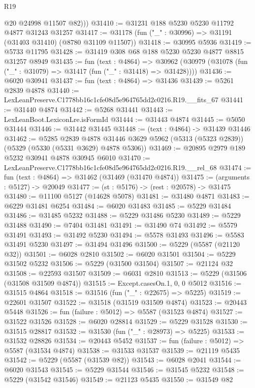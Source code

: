 \begin{lexlean}{R19}
\begin{coremodule}
          @20
          @24998
          @11507
          @82)))
@31410 := @31231 @188 @5230 @5230 @11792 @4877 @31243 @31257
@31417 := @31178 (fun ("_" : @30996) => @31191 (@31403 @31410) (@8780 @31109 @11507))
@31418 := @30995 @5936
@31419 := @5733 @11795
@31428 := @31419 @308 @68 @188 @5230 @5230 @4877 @8815 @31257 @8949
@31435 := fun (text : @4864) =>
  @30962 (@30979 (@31078 (fun ("_" : @31079) => @31417 (fun ("_" : @31418) => @31428))))
@31436 := @6020 @30941
@31437 := fun (text : @4864) => @31436
@31439 := @5261 @2839 @4878
@31440 := LexLeanPreserve.C1778bb16c1cfe08d5e964765dd2c0216.R19.__fits_67
@31441 := @31440 @4874
@31442 := @5268 @31441
@31443 := LexLeanBoot.LexiconLre.isFormId
@31444 := @31443 @4874
@31445 := @5050 @31444
@31446 := @31442 @31445
@31448 := (text : @4864) -> @31439 @31446
@31462 := @5285
    @2839
    @4878
    @31446
    @3629
    @5962
    (@5313 (@5323 @2839))
    (@5329 (@5330 (@5331 @3629) @4878 @5306))
@31469 := @20895 @2979 @189 @5232 @30941 @4878 @30945 @6010
@31470 := LexLeanPreserve.C1778bb16c1cfe08d5e964765dd2c0216.R19.__rel_68
@31474 := fun (text : @4864) => @31462 (@31469 (@31470 @4874))
@31475 := (arguments : @5127) -> @20049
@31477 := (st : @5176) -> (rest : @20578) -> @31475
@31480 := @11100 @5127 (@14628 @5078)
@31481 := @31480 @4871
@31483 := @6229 @31481 @6254
@31484 := @6020 @31483
@31485 := @5229 @31484
@31486 := @31485 @5232
@31488 := @5229 @31486 @5230
@31489 := @5229 @31488
@31490 := @7404 @31481
@31491 := @31490 @74
@31492 := @5579 @31491
@31493 := @31492 @5230
@31494 := @5578 @31493
@31496 := @5583 @31491 @5230
@31497 := @31494 @31496
@31500 := @5229 (@5587 (@21120 @32))
@31501 := @6028 @2810
@31502 := @6020 @31501
@31504 := @5229 @31502 @5232
@31506 := @5229 (@31500 @31504)
@31507 := @21124 @32
@31508 := @22593 @31507
@31509 := @6031 @2810
@31513 := @5229 (@31506 (@31508 @31509 @4874))
@31515 := Except.casesOn.{1, 0, 0} @5012
@31516 := @31515 @4864
@31518 := @31516 (fun ("_" : @22675) => @5225)
@31519 := @22601 @31507
@31522 := @31518 (@31519 @31509 @4874)
@31523 := @20443 @5448
@31526 := fun (failure : @5012) => @5587 (@31523 @4874)
@31527 := @31522 @31526
@31528 := @6020 @28814
@31529 := @5229 @31528
@31530 := @31515 @28817
@31532 := @31530 (fun ("_" : @28973) => @5225)
@31533 := @31532 @28826
@31534 := @20443 @5452
@31537 := fun (failure : @5012) => @5587 (@31534 @4874)
@31538 := @31533 @31537
@31539 := @21119 @5435
@31542 := @5229 (@5587 (@31539 @82))
@31543 := @6028 @2041
@31544 := @6020 @31543
@31545 := @5229 @31544
@31546 := @31545 @5232
@31548 := @5229 (@31542 @31546)
@31549 := @21123 @5435
@31550 := @31549 @82

\end{coremodule}
\end{lexlean}
